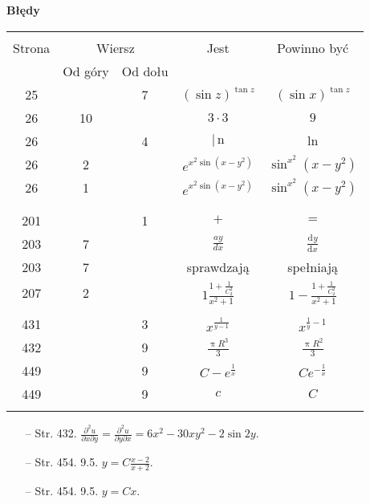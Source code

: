 \documentclass[a4paper,11pt]{article}
\newcommand{\fr}{\frac}
\newcommand{\tfr}{\tfrac}
\newcommand{\mr}{\mathrm}
\newcommand{\pr}{\partial}
\newcommand{\de}{\mr{d}}
\newcommand{\dd}[3]{\fr{ \de^{ #1 } { #2 } }{ \de { #3 }^{ #1 } } }
\newcommand{\tb}{\textbf}
\newcommand{\Center}[1]{\begin{center} #1 \end{center}}
\newcommand{\CenterTB}[1]{\Center{\tb{#1}}}
\begin{document}
\CenterTB{Błędy}
\begin{center}
  \begin{tabular}{|c|c|c|c|c|}
    \hline
    & \multicolumn{2}{c|}{} & & \\
    Strona & \multicolumn{2}{c|}{Wiersz}& Jest & Powinno być \\ \cline{2-3}
    & Od góry & Od dołu &  &  \\ \hline
    25 & & 7 & $( \sin z )^{ \tan z }$ & $( \sin x )^{ \tan z }$ \\
    26 & 10 & & $3 \cdot 3$ & $9$ \\
    26 & & 4 & $|\, \mr{n}$ & $\ln$ \\
    26 & 2 & & $e^{ x^{ 2 } \sin(x - y^{ 2 }) }$
           & $\sin^{ x^{ 2 } }(x - y^{ 2 })$ \\
    26 & 1 & & $e^{ x^{ 2 } \sin(x - y^{ 2 }) }$
           & $\sin^{ x^{ 2 } }(x - y^{ 2 })$ \\
    & & & & \\
    & & & & \\
    201 & & 1 & $+$ & $=$ \\
    203 & 7 & & $\fr{ a y }{ d x }$ & $\dd{}{ y }{ x }$ \\
    203 & 7 & & sprawdzają & spełniają \\
    207 & 2 & & $1 \fr{ 1 + \tfr{ 1 }{ C_{ 2 }^{ 2 } } }
                { x^{ 2 } + 1 }$
           & $1 - \fr{ 1 + \fr{ 1 }{ C_{ 2 }^{ 2 } } }
             { x^{ 2 } + 1 }$ \\
    & & & & \\
    431 & & 3 & $x^{ \fr{ 1 }{ y - 1 } }$ & $x^{ \fr{ 1 }{ y } - 1 }$ \\
    432 & & 9 & $\fr{\uppi R^{ 3 } }{ 3 }$ & $\fr{\uppi R^{ 2 } }{ 3 }$ \\
    449 & & 9 & $C - e^{ \fr{ 1 }{ x } }$ & $C e^{ -\fr{ 1 }{ x } }$ \\
    449 & & 9 & $c$ & $C$ \\
    & & & & \\ \hline
  \end{tabular}
\end{center}

\begin{itemize}
\item[--] Str. 432.
  $\fr{ \pr^{ 2 } u }{ \pr x \pr y } = \fr{ \pr^{ 2 } u }{ \pr y \pr x
  } = 6 x^{ 2 } - 30 x y^{ 2 } - 2 \sin 2y$.

\item[--] Str. 454. 9.5. $y = C \frac{ x - 2 }{ x + 2 }$.

\item[--] Str. 454. 9.5. $y = C x$.

\end{itemize}
\end{document}

